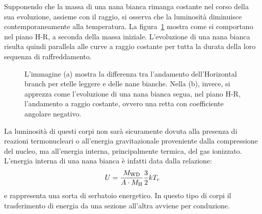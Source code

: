 Supponendo che la massa di una nana bianca rimanga costante nel corso della sua evoluzione, assieme con il raggio, si osserva che la luminosità diminuisce contemporaneamente alla temperatura. La figura~\ref{fig:WD} mostra come si comportano nel piano H-R, a seconda della massa iniziale. L'evoluzione di una nana bianca risulta quindi parallela alle curve a raggio costante per tutta la durata della loro sequenza di raffreddamento.
\begin{figure}
    \centering
     \qquad
    \caption{L'immagine (a) mostra la differenza tra l'andamento dell'Horizontal branch per stelle leggere e delle nane bianche. Nella (b), invece, si apprezza come l'evoluzione di una nana bianca segua, nel piano H-R, l'andamento a raggio costante, ovvero una retta con coefficiente angolare negativo.}\label{fig:WD}
\end{figure}

La luminosità di questi corpi non sarà sicuramente dovuta alla presenza di reazioni termonucleari o all'energia gravitazionale proveniente dalla compressione del nucleo, ma all'energia interna, principalmente termica, del gas ionizzato. L'energia interna di una nana bianca è infatti data dalla relazione: 
\[
    U = \frac{M_\textup{WD}}{A \cdot M_\textup{H}} \frac{3}{2} k T_c
\]
e rappresenta una sorta di serbatoio energetico. In questo tipo di corpi il trasferimento di energia da una sezione all'altra avviene per conduzione.

